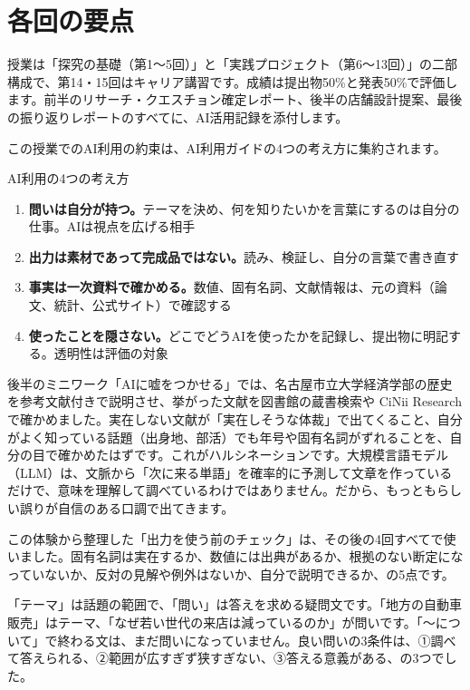 \section{各回の要点}


授業は「探究の基礎（第1〜5回）」と「実践プロジェクト（第6〜13回）」の二部構成で、第14・15回はキャリア講習です。成績は提出物50\%と発表50\%で評価します。前半のリサーチ・クエスチョン確定レポート、後半の店舗設計提案、最後の振り返りレポートのすべてに、AI活用記録を添付します。

この授業でのAI利用の約束は、AI利用ガイドの4つの考え方に集約されます。

\begin{keybox}{AI利用の4つの考え方}
\begin{enumerate}[label=\arabic*.,leftmargin=1.6em,itemsep=0.3mm]
  \item \textbf{問いは自分が持つ。}テーマを決め、何を知りたいかを言葉にするのは自分の仕事。AIは視点を広げる相手
  \item \textbf{出力は素材であって完成品ではない。}読み、検証し、自分の言葉で書き直す
  \item \textbf{事実は一次資料で確かめる。}数値、固有名詞、文献情報は、元の資料（論文、統計、公式サイト）で確認する
  \item \textbf{使ったことを隠さない。}どこでどうAIを使ったかを記録し、提出物に明記する。透明性は評価の対象
\end{enumerate}
\end{keybox}

後半のミニワーク「AIに嘘をつかせる」では、名古屋市立大学経済学部の歴史を参考文献付きで説明させ、挙がった文献を図書館の蔵書検索や CiNii Research で確かめました。実在しない文献が「実在しそうな体裁」で出てくること、自分がよく知っている話題（出身地、部活）でも年号や固有名詞がずれることを、自分の目で確かめたはずです。これがハルシネーションです。大規模言語モデル（LLM）は、文脈から「次に来る単語」を確率的に予測して文章を作っているだけで、意味を理解して調べているわけではありません。だから、もっともらしい誤りが自信のある口調で出てきます。

この体験から整理した「出力を使う前のチェック」は、その後の4回すべてで使いました。固有名詞は実在するか、数値には出典があるか、根拠のない断定になっていないか、反対の見解や例外はないか、自分で説明できるか、の5点です。


「テーマ」は話題の範囲で、「問い」は答えを求める疑問文です。「地方の自動車販売」はテーマ、「なぜ若い世代の来店は減っているのか」が問いです。「〜について」で終わる文は、まだ問いになっていません。良い問いの3条件は、①調べて答えられる、②範囲が広すぎず狭すぎない、③答える意義がある、の3つでした。

